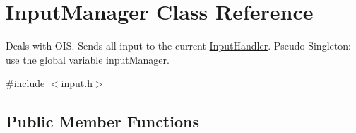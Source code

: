 \hypertarget{classInputManager}{
\section{\-Input\-Manager \-Class \-Reference}
\label{d5/d39/classInputManager}
}


\-Deals with \-O\-I\-S. \-Sends all input to the current \hyperlink{classInputHandler}{\-Input\-Handler}. \-Pseudo-\/\-Singleton\-: use the global variable input\-Manager.  




{\ttfamily \#include $<$input.\-h$>$}

\subsection*{\-Public \-Member \-Functions}
